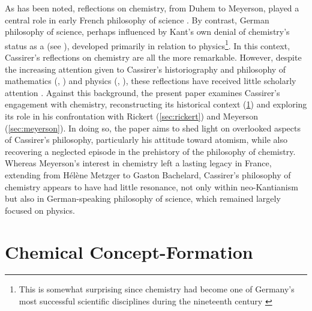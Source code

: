 \documentclass[submitted,12pt]{article}
\begin{document}
As has been noted, reflections on chemistry, from Duhem to Meyerson, played a central role in early French philosophy of science \citep{Bensaude-Vincent2009a}. By contrast, German philosophy of science, perhaps influenced by Kant's own denial of chemistry's status as a  (see \cite{Carrier2001}), developed primarily in relation to physics\footnote{This is somewhat surprising since chemistry had become one of Germany's most successful scientific disciplines during the nineteenth century \citep{Rocke2021}}. In this context, Cassirer's reflections on chemistry are all the more remarkable. However, despite the increasing attention given to Cassirer's historiography and philosophy of mathematics (\cite{Schiemer2018}, \cite{Reck2020}) and physics (\cite{Ryckman2005}, \cite{French2014}), these reflections have received little scholarly attention \citep[see][30]{VanBrakel2012}. Against this background, the present paper examines Cassirer's engagement with chemistry, reconstructing its historical context (\cref{sec:chemistry}) and exploring its role in his confrontation with Rickert (\cref{sec:rickert}) and Meyerson (\cref{sec:meyerson}). In doing so, the paper aims to shed light on overlooked aspects of Cassirer’s philosophy, particularly his attitude toward atomism, while also recovering a neglected episode in the prehistory of the philosophy of chemistry. Whereas Meyerson's interest in chemistry left a lasting legacy in France, extending from H{\'e}l{\`e}ne Metzger to Gaston Bachelard, Cassirer's philosophy of chemistry appears to have had little resonance, not only within neo-Kantianism but also in German-speaking philosophy of science, which remained largely focused on physics. 

\section{Chemical Concept-Formation}
\label{sec:chemistry}
\end{document}
